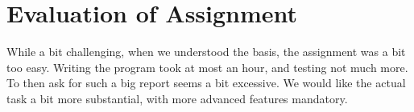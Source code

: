 \section{Evaluation of Assignment}

While a bit challenging, when we understood the basis, the assignment was a bit too easy.
Writing the program took at most an hour, and testing not much more.
To then ask for such a big report seems a bit excessive.
We would like the actual task a bit more substantial, with more advanced features mandatory.

